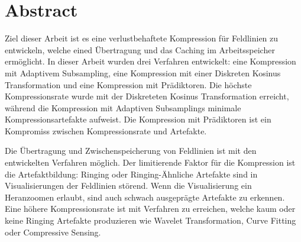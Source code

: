 \section*{Abstract}
Ziel dieser Arbeit ist es eine verlustbehaftete Kompression für Feldlinien zu entwickeln, welche eined Übertragung und das Caching im Arbeitsspeicher ermöglicht. In dieser Arbeit wurden drei Verfahren entwickelt: eine Kompression mit Adaptivem Subsampling, eine Kompression mit einer Diskreten Kosinus Transformation und eine Kompression mit Prädiktoren. Die höchste Kompressionsrate wurde mit der Diskreteten Kosinus Transformation erreicht, während die Kompression mit Adaptiven Subsamplings minimale Kompressionsartefakte aufweist. Die Kompression mit Prädiktoren ist ein Kompromiss zwischen Kompressionsrate und Artefakte.

Die Übertragung und Zwischenspeicherung von Feldlinien ist mit den entwickelten Verfahren möglich. Der limitierende Faktor für die Kompression ist die Artefaktbildung: Ringing oder Ringing-Ähnliche Artefakte sind in Visualisierungen der Feldlinien störend. Wenn die Visualisierung ein Heranzoomen erlaubt, sind auch schwach ausgeprägte Artefakte zu erkennen. Eine höhere Kompressionsrate ist mit Verfahren zu erreichen, welche kaum oder keine Ringing Artefakte produzieren wie Wavelet Transformation, Curve Fitting oder Compressive Sensing.